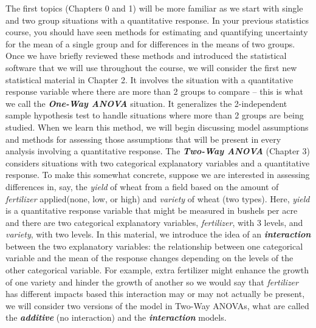 \documentclass[]{book}
\begin{document}
The first topics (Chapters 0 and 1) will be more familiar as we start
with single and two group situations with a quantitative response. In
your previous statistics course, you should have seen methods for
estimating and quantifying uncertainty for the mean of a single group
and for differences in the means of two groups. Once we have briefly
reviewed these methods and introduced the statistical software that we
will use throughout the course, we will consider the first new
statistical material in Chapter 2. It involves the situation with a
quantitative response variable where there are more than 2 groups to
compare -- this is what we call the \textbf{\emph{One-Way ANOVA}}
situation. It generalizes the 2-independent sample hypothesis test to
handle situations where more than 2 groups are being studied. When we
learn this method, we will begin discussing model assumptions and
methods for assessing those assumptions that will be present in every
analysis involving a quantitative response. The \textbf{\emph{Two-Way
ANOVA}} (Chapter 3) considers situations with two categorical
explanatory variables and a quantitative response. To make this somewhat
concrete, suppose we are interested in assessing differences in, say,
the \emph{yield} of wheat from a field based on the amount of
\emph{fertilizer} applied(none, low, or high) and \emph{variety} of
wheat (two types). Here, \emph{yield} is a quantitative response
variable that might be measured in bushels per acre and there are two
categorical explanatory variables, \emph{fertilizer}, with 3 levels, and
\emph{variety}, with two levels. In this material, we introduce the idea
of an \textbf{\emph{interaction}} between the two explanatory variables:
the relationship between one categorical variable and the mean of the
response changes depending on the levels of the other categorical
variable. For example, extra fertilizer might enhance the growth of one
variety and hinder the growth of another so we would say that
\emph{fertilizer} has different impacts based this interaction may or
may not actually be present, we will consider two versions of the model
in Two-Way ANOVAs, what are called the \textbf{\emph{additive}} (no
interaction) and the \textbf{\emph{interaction}} models.
\end{document}
